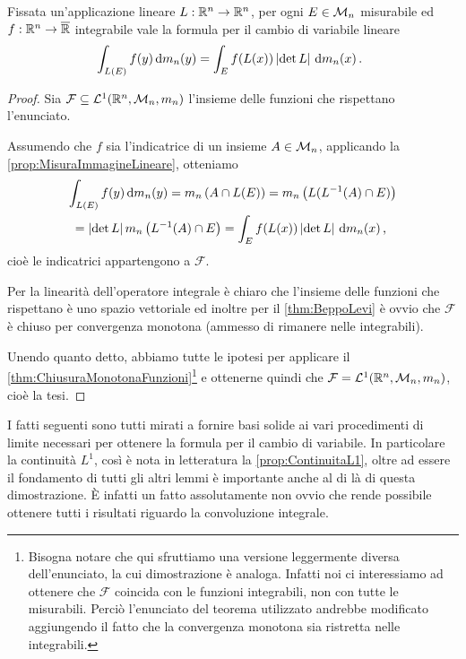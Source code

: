 \begin{corollary}\label{cor:CambioVariabileLineare}
	Fissata un'applicazione lineare $L:\mathbb R^n\to\mathbb R^n$, per ogni $E\in\mathcal M_n$ misurabile ed $f:\mathbb R^n\to\overline{\mathbb R}$ integrabile vale la formula per il cambio di variabile lineare
	\begin{equation*}
		\int_{L(E)}f(y)\,\mathrm d m_n(y) = \int_E f(L(x))\left\lvert\det L\right\rvert \,\mathrm d m_n(x) \, \text{. }
	\end{equation*}
\end{corollary}
\begin{proof}
	Sia $\mathcal F\subseteq \mathcal L^1(\mathbb R^n,\mathcal M_n,m_n)$ l'insieme delle funzioni che rispettano l'enunciato.
	
	Assumendo che $f$ sia l'indicatrice di un insieme $A\in\mathcal M_n$, applicando la \cref{prop:MisuraImmagineLineare}, otteniamo
	\begin{multline*}
		\int_{L(E)}f(y)\,\mathrm d m_n(y)=m_n\left( A\cap L(E) \right)=m_n\left(L(L^{-1}(A)\cap E)\right)\\
		=\left\lvert\det L\right\rvert m_n\left(L^{-1}(A)\cap E\right)=\int_E f(L(x))\left\lvert\det L\right\rvert \,\mathrm d m_n(x) \, \text{, }
	\end{multline*}
	cioè le indicatrici appartengono a $\mathcal F$.
	
	Per la linearità dell'operatore integrale è chiaro che l'insieme delle funzioni che rispettano è uno spazio vettoriale ed inoltre per il \cref{thm:BeppoLevi} è ovvio che $\mathcal F$ è chiuso per convergenza monotona (ammesso di rimanere nelle integrabili).
	
	Unendo quanto detto, abbiamo tutte le ipotesi per applicare il \cref{thm:ChiusuraMonotonaFunzioni}\footnote{Bisogna notare che qui sfruttiamo una versione leggermente diversa dell'enunciato, la cui dimostrazione è analoga. Infatti noi ci interessiamo ad ottenere che $\mathcal F$ coincida con le funzioni integrabili, non con tutte le misurabili. 
	Perciò l'enunciato del teorema utilizzato andrebbe modificato aggiungendo il fatto che la convergenza monotona sia ristretta nelle integrabili.} e ottenerne quindi che $\mathcal F=\mathcal L^1(\mathbb R^n,\mathcal M_n,m_n)$, cioè la tesi.
\end{proof}

I fatti seguenti sono tutti mirati a fornire basi solide ai vari procedimenti di limite necessari per ottenere la formula per il cambio di variabile.
In particolare la continuità $L^1$, così è nota in letteratura la \cref{prop:ContinuitaL1}, oltre ad essere il fondamento di tutti gli altri lemmi è importante anche al di là di questa dimostrazione. È infatti un fatto assolutamente non ovvio che rende possibile ottenere tutti i risultati riguardo la convoluzione integrale.

